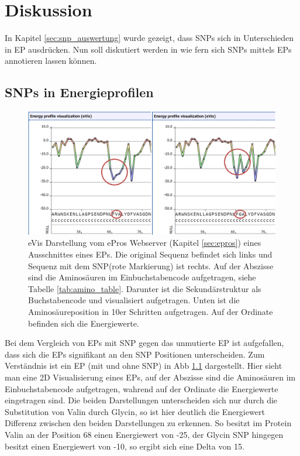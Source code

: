 \chapter{Diskussion}

In Kapitel \ref{sec:snp_auswertung} wurde gezeigt, dass \ac{SNP}s sich in Unterschieden in \ac{EP} ausdrücken. Nun soll diskutiert werden in wie fern sich \ac{SNP}s mittels \ac{EP}s annotieren lassen können.

\section{SNPs in Energieprofilen}
\label{sec:snps_in_eps}

\begin{figure}
    \centering
    \includegraphics[width=.99\textwidth]{images/ep_vs_snp.png}
    \caption{\ac{eVis} Darstellung vom ePros Webserver (Kapitel \ref{sec:epros}) eines Ausschnittes eines \ac{EP}s. Die original Sequenz befindet sich links und Sequenz mit dem \ac{SNP}(rote Markierung) ist rechts. Auf der Abszisse sind die Aminosäuren im Einbuchstabencode aufgetragen, siehe Tabelle \ref{tab:amino_table}. Darunter ist die Sekundärstruktur als Buchstabencode und visualisiert aufgetragen. Unten ist die Aminosäureposition in 10er Schritten aufgetragen. Auf der Ordinate befinden sich die Energiewerte.}
    \label{fig:ep_vs_snp}
\end{figure}

Bei dem Vergleich von \ac{EP}s mit \ac{SNP} gegen das unmutierte \ac{EP} ist aufgefallen, dass sich die \ac{EP}s signifikant an den \ac{SNP} Positionen unterscheiden. Zum Verständnis ist ein \ac{EP} (mit und ohne \ac{SNP}) in \ac{Abb} \ref{fig:ep_vs_snp} dargestellt. Hier sieht man eine 2D Visualisierung eines \ac{EP}s, auf der Abszisse sind die Aminosäuren im Einbuchstabencode aufgetragen, wahrend auf der Ordinate die Energiewerte eingetragen sind. Die beiden Darstellungen unterscheiden sich nur durch die Substitution von Valin durch Glycin, so ist hier deutlich die Energiewert Differenz zwischen den beiden Darstellungen zu erkennen. So besitzt im Protein Valin an der Position 68 einen Energiewert von -25, der Glycin \ac{SNP} hingegen besitzt einen Energiewert von -10, so ergibt sich eine Delta von 15. 

